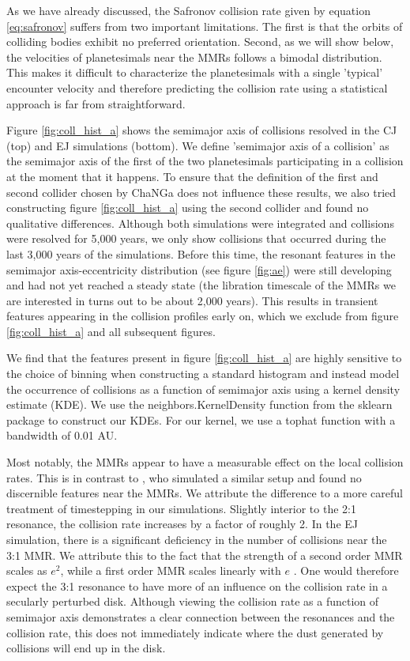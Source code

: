 \documentclass[onecolumn]{aastex63}
\begin{document}
As we have already discussed, the Safronov collision rate given by equation \ref{eq:safronov} suffers from two important limitations. The
first is that the orbits of colliding bodies exhibit no preferred orientation. Second, as we will show below, the velocities of planetesimals 
near the MMRs follows a bimodal distribution. This makes it difficult to characterize the planetesimals with a single 'typical' encounter 
velocity and therefore predicting the collision rate using a statistical approach is far from straightforward.

Figure \ref{fig:coll_hist_a} shows the semimajor axis of collisions resolved in the CJ (top) and EJ simulations (bottom). We define 
'semimajor axis of a collision' as the semimajor axis of the first of the two planetesimals participating in a collision at the 
moment that it happens. To ensure that the definition of the first and second collider chosen by {\sc ChaNGa} does not influence 
these results, we also tried constructing figure \ref{fig:coll_hist_a} using the second collider and found no qualitative differences. 
Although both simulations were integrated and collisions were resolved for 5,000 years, we only show collisions that occurred during 
the last 3,000 years of the simulations. Before this time, the resonant features in the semimajor axis-eccentricity distribution (see 
figure \ref{fig:ae}) were still developing and had not yet reached a steady state (the libration timescale of the MMRs we are interested in 
turns out to be about 2,000 years). This results in transient features appearing in the collision profiles early on, which we exclude from 
figure \ref{fig:coll_hist_a} and all subsequent figures.

We find that the features present in figure \ref{fig:coll_hist_a} are highly sensitive to the choice of binning when constructing a standard 
histogram and instead model the occurrence of collisions as a function of semimajor axis using a kernel density estimate (KDE). We use 
the {\sc neighbors.KernelDensity} function from the {\sc sklearn} \citep{scikit-learn} package to construct our KDEs. For our kernel, we use 
a tophat function with a bandwidth of 0.01 AU.

Most notably, the MMRs appear to have a measurable effect on the local collision rates. This is in contrast to \citet{2000Icar..143...45R}, 
who simulated a similar setup and found no discernible features near the MMRs. We attribute the difference to a more careful treatment of 
timestepping in our simulations. Slightly interior to the 2:1 resonance, the collision rate increases by a factor of roughly 2. In the EJ 
simulation, there is a significant deficiency in the number of collisions near the 3:1 MMR. We attribute this to the fact that the strength of a 
second order MMR scales as $e^{2}$, while a first order MMR scales linearly with $e$ \citep{1994PhyD...77..289M}. One would therefore 
expect the 3:1 resonance to have more of an influence on the collision rate in a secularly perturbed disk. Although viewing the collision rate 
as a function of semimajor axis demonstrates a clear connection between the resonances and the collision rate, this does not immediately 
indicate where the dust generated by collisions will end up in the disk.
\end{document}
